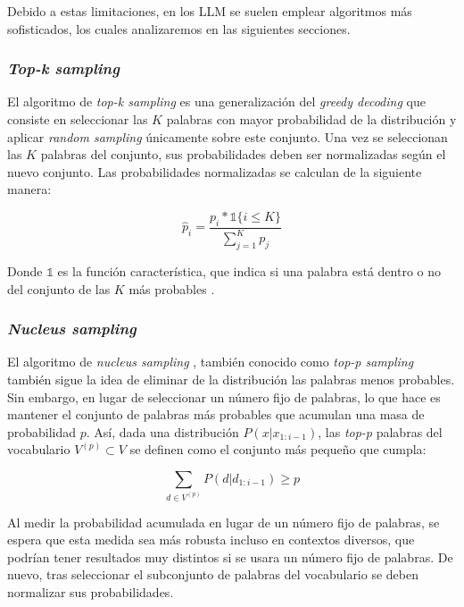 \documentclass[11pt,spanish,listoffigures,listoftables]{tfgetsinf}
\begin{document}
Debido a estas limitaciones, en los LLM se suelen emplear algoritmos más sofisticados, los cuales analizaremos en las siguientes secciones.

\subsubsection{\textit{Top-k sampling}}

El algoritmo de \textit{top-k sampling} es una generalización del \textit{greedy decoding} que consiste en seleccionar las $K$ palabras con mayor probabilidad de la distribución y aplicar \textit{random sampling} únicamente sobre este conjunto. Una vez se seleccionan las $K$ palabras del conjunto, sus probabilidades deben ser normalizadas según el nuevo conjunto. Las probabilidades normalizadas se calculan de la siguiente manera:

\begin{equation}
\hat{p}_i = \frac{p_i * \mathbb{1}\{i \leq K\}}{\sum_{j = 1}^K p_j}
\end{equation}

Donde $\mathbb{1}$ es la función característica, que indica si una palabra está dentro o no del conjunto de las $K$ más probables \cite{nadeem2020systematiccharacterizationsamplingalgorithms}.

\subsubsection{\textit{Nucleus sampling}}

El algoritmo de \textit{nucleus sampling} \cite{holtzman2020curiouscaseneuraltext}, también conocido como \textit{top-p sampling} también sigue la idea de eliminar de la distribución las palabras menos probables. Sin embargo, en lugar de seleccionar un número fijo de palabras, lo que hace es mantener el conjunto de palabras más probables que acumulan una masa de probabilidad $p$. Así, dada una distribución $P(x |x_{1:i-1})$, las \textit{top-p} palabras del vocabulario $V^{(p)} \subset V$ se definen como el conjunto más pequeño que cumpla:

\begin{equation}
\sum_{d \in V^{(p)}} P(d | d_{1:i-1}) \ge p
\end{equation}

Al medir la probabilidad acumulada en lugar de un número fijo de palabras, se espera que esta medida sea más robusta incluso en contextos diversos, que podrían tener resultados muy distintos si se usara un número fijo de palabras. De nuevo, tras seleccionar el subconjunto de palabras del vocabulario se deben normalizar sus probabilidades.
\end{document}

